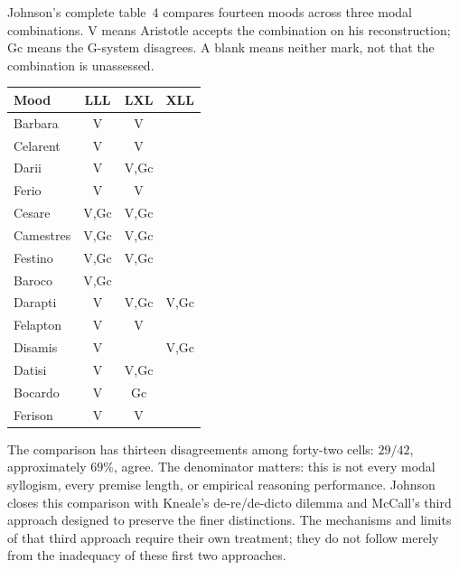 Johnson's complete table~4 compares fourteen moods across three
modal combinations. V means Aristotle accepts the combination on his
reconstruction; Gc means the G-system disagrees. A blank means neither
mark, not that the combination is unassessed.
\parencite[p.~264]{Johnson2004ModalSyllogisms}

\begin{tabular}{@{}lccc@{}}
\toprule Mood & LLL & LXL & XLL\\ \midrule
Barbara & V & V &\\
Celarent & V & V &\\
Darii & V & V,Gc &\\
Ferio & V & V &\\
Cesare & V,Gc & V,Gc &\\
Camestres & V,Gc & V,Gc &\\
Festino & V,Gc & V,Gc &\\
Baroco & V,Gc & &\\
Darapti & V & V,Gc & V,Gc\\
Felapton & V & V &\\
Disamis & V & & V,Gc\\
Datisi & V & V,Gc &\\
Bocardo & V & Gc &\\
Ferison & V & V &\\
\bottomrule
\end{tabular}

The comparison has thirteen disagreements among forty-two cells:
\(29/42\), approximately \(69\%\), agree. The denominator matters:
this is not every modal syllogism, every premise length, or empirical
reasoning performance. Johnson closes this comparison with Kneale's
de-re/de-dicto dilemma and McCall's third approach designed to preserve
the finer distinctions. The mechanisms and limits of that third
approach require their own treatment; they do not follow merely from
the inadequacy of these first two approaches.
